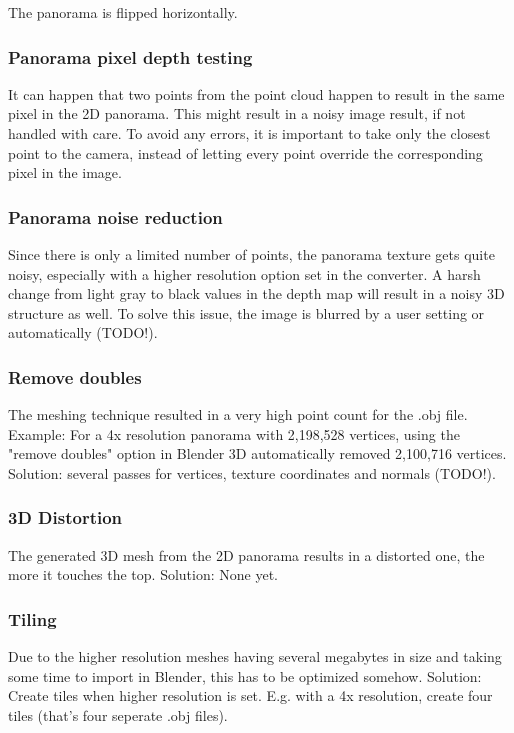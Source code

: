 The panorama is flipped horizontally.

\subsubsection{Panorama pixel depth testing}

It can happen that two points from the point cloud happen to result in the same pixel in the 2D panorama. This might result in a noisy image result, if not handled with care. To avoid any errors, it is important to take only the closest point to the camera, instead of letting every point override the corresponding pixel in the image.

\subsubsection{Panorama noise reduction}

Since there is only a limited number of points, the panorama texture gets quite noisy, especially with a higher resolution option set in the converter. A harsh change from light gray to black values in the depth map will result in a noisy 3D structure as well.
To solve this issue, the image is blurred by a user setting or automatically (TODO!).

\subsubsection{Remove doubles}

The meshing technique resulted in a very high point count for the .obj file. Example: For a 4x resolution panorama with 2,198,528 vertices, using the "remove doubles" option in Blender 3D automatically removed 2,100,716 vertices.
Solution: several passes for vertices, texture coordinates and normals (TODO!).

\subsubsection{3D Distortion}

The generated 3D mesh from the 2D panorama results in a distorted one, the more it touches the top.
Solution: None yet.

\subsubsection{Tiling}

Due to the higher resolution meshes having several megabytes in size and taking some time to import in Blender, this has to be optimized somehow.
Solution: Create tiles when higher resolution is set. E.g. with a 4x resolution, create four tiles (that's four seperate .obj files).
